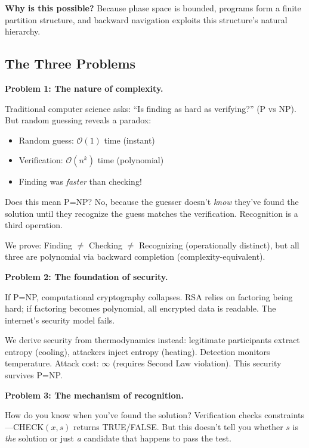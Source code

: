 \documentclass[twocolumn,10pt]{article}
\theoremstyle{definition}
\theoremstyle{remark}
\newcommand{\bigO}{\mathcal{O}}
\begin{document}
\vspace{0.2cm}
\noindent\textbf{Why is this possible?} Because phase space is bounded, programs form a finite partition structure, and backward navigation exploits this structure's natural hierarchy.

\subsection{The Three Problems}

\textbf{Problem 1: The nature of complexity.}

Traditional computer science asks: ``Is finding as hard as verifying?'' (P vs NP)\cite{cook1971,karp1972}. But random guessing reveals a paradox:
\begin{itemize}
\item Random guess: $\bigO(1)$ time (instant)
\item Verification: $\bigO(n^k)$ time (polynomial)
\item Finding was \textit{faster} than checking!
\end{itemize}

Does this mean P=NP? No, because the guesser doesn't \textit{know} they've found the solution until they recognize the guess matches the verification. Recognition is a third operation.

\vspace{0.2cm}
\noindent We prove: Finding $\neq$ Checking $\neq$ Recognizing (operationally distinct), but all three are polynomial via backward completion (complexity-equivalent).

\vspace{0.2cm}
\noindent\textbf{Problem 2: The foundation of security.}

If P=NP, computational cryptography collapses. RSA relies on factoring being hard\cite{rivest1978}; if factoring becomes polynomial, all encrypted data is readable. The internet's security model fails.

\vspace{0.2cm}
\noindent We derive security from thermodynamics instead: legitimate participants extract entropy (cooling), attackers inject entropy (heating). Detection monitors temperature. Attack cost: $\infty$ (requires Second Law violation). This security survives P=NP.

\vspace{0.2cm}
\noindent\textbf{Problem 3: The mechanism of recognition.}

How do you know when you've found the solution? Verification checks constraints—CHECK$(x,s)$ returns TRUE/FALSE. But this doesn't tell you whether $s$ is \textit{the} solution or just \textit{a} candidate that happens to pass the test.
\end{document}
